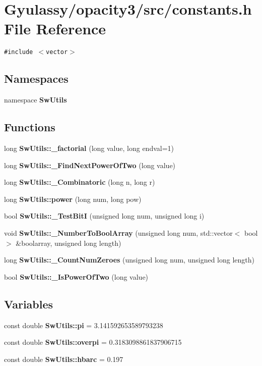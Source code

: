 \section{Gyulassy/opacity3/src/constants.h File Reference}
\label{constants_8h}
{\tt \#include $<$vector$>$}\par
\subsection*{Namespaces}
\begin{CompactItemize}
\item 
namespace {\bf SwUtils}
\end{CompactItemize}
\subsection*{Functions}
\begin{CompactItemize}
\item 
long {\bf SwUtils::\_\-factorial} (long value, long endval=1)
\item 
long {\bf SwUtils::\_\-FindNextPowerOfTwo} (long value)
\item 
long {\bf SwUtils::\_\-Combinatoric} (long n, long r)
\item 
long {\bf SwUtils::power} (long num, long pow)
\item 
bool {\bf SwUtils::\_\-TestBitI} (unsigned long num, unsigned long i)
\item 
void {\bf SwUtils::\_\-NumberToBoolArray} (unsigned long num, std::vector$<$ bool $>$ \&boolarray, unsigned long length)
\item 
long {\bf SwUtils::\_\-CountNumZeroes} (unsigned long num, unsigned long length)
\item 
bool {\bf SwUtils::\_\-IsPowerOfTwo} (long value)
\end{CompactItemize}
\subsection*{Variables}
\begin{CompactItemize}
\item 
const double {\bf SwUtils::pi} = 3.141592653589793238
\item 
const double {\bf SwUtils::overpi} = 0.3183098861837906715
\item 
const double {\bf SwUtils::hbarc} = 0.197
\end{CompactItemize}
